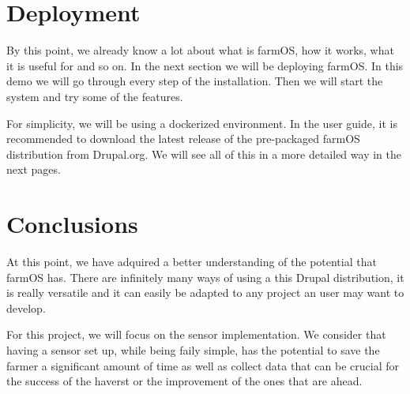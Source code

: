 \section{Deployment}
By this point, we already know a lot about what is farmOS, how it works, what it is useful for and so on. In the next section we will be deploying farmOS. In this demo we will go through every step of the installation. Then we will start the system and try some of the features.

For simplicity, we will be using a dockerized environment. In the user guide, it is recommended to download the latest release of the pre-packaged farmOS distribution from Drupal.org. We will see all of this in a more detailed way in the next pages.

\section{Conclusions}
At this point, we have adquired a better understanding of the potential that farmOS has. There are infinitely many ways of using a this Drupal distribution, it is really versatile and it can easily be adapted to any project an user may want to develop.

For this project, we will focus on the sensor implementation. We consider that having a sensor set up, while being faily simple, has the potential to save the farmer a significant amount of time as well as collect data that can be crucial for the success of the haverst or the improvement of the ones that are ahead.